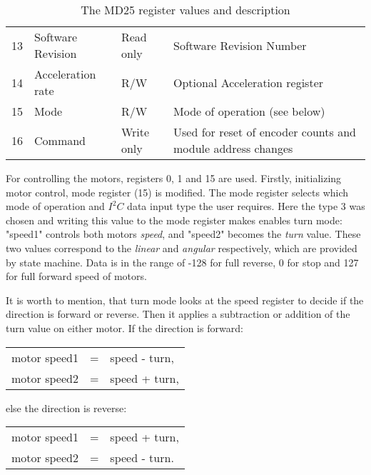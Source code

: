 \begin{table}[!h]
\begin{tabular}{@{}llll@{}}
		13                & Software Revision & Read only           & Software Revision Number                                         \\
		14                & Acceleration rate & R/W                 & Optional Acceleration register                                   \\
		15                & Mode              & R/W                 & Mode of operation (see below)                                    \\
		16                & Command           & Write only          & Used for reset of encoder counts and module address changes      \\ \bottomrule
	\end{tabular}
	\caption{The MD25 register values and description}
	\label{table:md25}
\end{table}

\newpage
For controlling the motors, registers 0, 1 and 15 are used. Firstly, initializing motor control, mode register (15) is modified.
The mode register selects which mode of operation and $I^2C$ data input type the user requires. Here the type 3 was chosen and writing this value 
to the mode register makes enables turn mode: "speed1" controls both motors \textit{speed}, and "speed2" becomes the \textit{turn} value. 
These two values correspond to the \textit{linear} and \textit{angular} respectively, which are provided by state machine.
Data is in the range of -128 for full reverse, 0 for stop and 127 for full forward speed of motors.

It is worth to mention, that turn mode looks at the speed register to decide if the direction is forward or reverse. Then it applies a subtraction or addition of the turn value on either motor. If the direction is forward:
\begin{table}[!ht]
	\centering
	\begin{tabular}{lcl}
		motor speed1 & = & speed - turn,\\
		motor speed2 & = & speed + turn,
	\end{tabular}
\end{table}

else the direction is reverse:
\begin{table}[!ht]
	\centering
	\begin{tabular}{lcl}
		motor speed1 & = & speed + turn,\\
		motor speed2 & = & speed - turn.
	\end{tabular}
\end{table}

